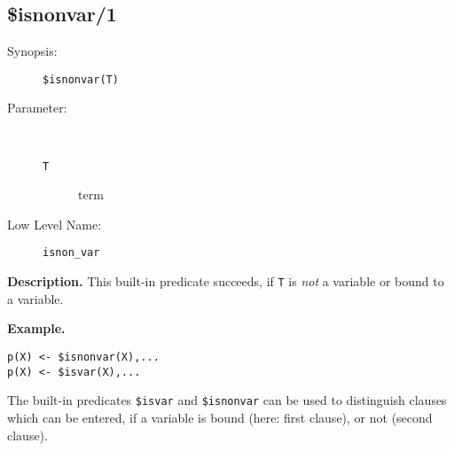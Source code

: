 %
%
%
\subsection{\$isnonvar/1}

\begin{description}
\item[Synopsis:]
	{\tt \$isnonvar(T)}
\item[Parameter:]\ \\[-0.5cm]
	\begin{description}
	\item[{\tt T}] term
	\end{description}
\item[Low Level Name:]
	{\tt isnon\_var}
\end{description}

\vspace*{0.5cm}
\noindent
{\bf Description.}
This built-in predicate succeeds, if {\tt T} is
{\em not\/} a variable or bound to a variable.

\vspace*{0.5cm}
\noindent
{\bf Example.}
\begin{verbatim}
p(X) <- $isnonvar(X),...
p(X) <- $isvar(X),...
\end{verbatim}
The built-in predicates {\tt \$isvar} and {\tt \$isnonvar} can be used
to distinguish clauses which can be entered, if a variable is bound
(here: first clause), or not (second clause).




